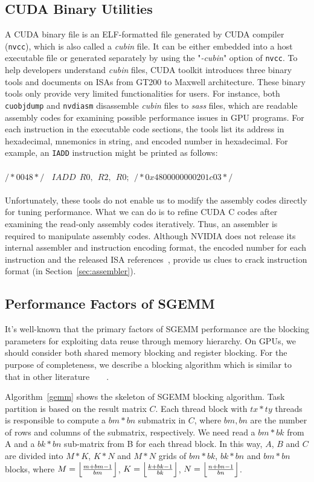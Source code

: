 \documentclass{sig-alternate-05-2015}
\begin{document}
\subsection{CUDA Binary Utilities}
\label{sec:cuda}

A CUDA binary file is an ELF-formatted file generated by CUDA compiler ({\tt nvcc}), which is also called a {\em cubin} file. It can be either embedded into a host executable file or generated separately by using the "{\em -cubin}" option of {\tt nvcc}. To help developers understand {\em cubin} files, CUDA toolkit introduces three binary tools and documents on ISAs from GT200 to Maxwell architecture. These binary tools only provide very limited functionalities for users. For instance, both {\tt cuobjdump} and {\tt nvdiasm} disassemble {\em cubin} files to {\em sass} files, which are readable assembly codes for examining possible performance issues in GPU programs. For each instruction in the executable code sections, the tools list its address in hexadecimal, mnemonics in string, and encoded number in hexadecimal. For example, an {\tt IADD} instruction might be printed as follows: \\\\
$/*0048*/~~~~IADD~~R0,~~R2,~~R0;~~/* 0x4800000000201c03 */$\\\\
Unfortunately, these tools do not enable us to modify the assembly codes directly for tuning performance. What we can do is to refine CUDA C codes after examining the read-only assembly codes iteratively. Thus, an assembler is required to manipulate assembly codes. Although NVIDIA does not release its internal assembler and instruction encoding format, the encoded number for each instruction and the released ISA references~\cite{ptx2015isa}, provide us clues to crack instruction format (in Section~\ref{sec:assembler}).


\subsection{Performance Factors of SGEMM}
It's well-known that the primary factors of SGEMM performance are the blocking parameters for exploiting data reuse through memory hierarchy. On GPUs, we should consider both shared memory blocking and register blocking. For the purpose of completeness, we describe a blocking algorithm which is similar to that in other literature~\cite{magma}~\cite{nervana_sgemm_wiki}~\cite{lai}~\cite{tan}.

Algorithm~\ref{gemm} shows the skeleton of SGEMM blocking algorithm. Task partition is based on the result matrix $C$. Each thread block with $tx*ty$ threads is responsible to compute a $bm*bn$ submatrix in $C$, where $bm, bn$ are the number of rows and columns of the submatrix, respectively. We need read a $bm*bk$ from A and a $bk*bn$ sub-matrix from B for each thread block. In this way, $A$, $B$ and $C$ are divided into $M*K$, $K*N$ and $M*N$ grids of $bm*bk$, $bk*bn$ and $bm*bn$ blocks, where $M=\Bigl\lfloor \frac{m+bm-1}{bm} \Bigr\rfloor$, $K=\Bigl\lfloor \frac{k+bk-1}{bk} \Bigr\rfloor$, $N=\Bigl\lfloor \frac{n+bn-1}{bn} \Bigr\rfloor$.
\end{document}
